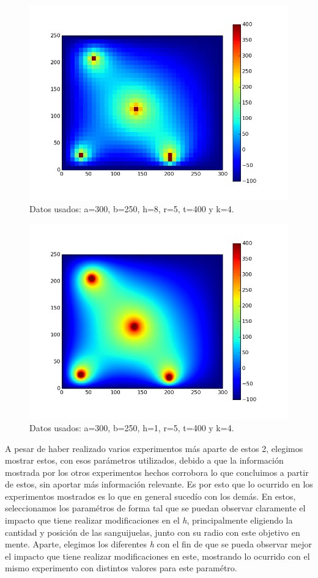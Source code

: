 \documentclass[10pt, a4paper]{article}
\begin{document}
\begin{figure}[H]
\centering
\includegraphics[scale=0.4]{E2ConH8.png}
\caption{Datos usados: a=300, b=250, h=8, r=5, t=400 y k=4.}
\end{figure}

\begin{figure}[H]
\centering
\includegraphics[scale=0.4]{E2ConH1.png}
\caption{Datos usados: a=300, b=250, h=1, r=5, t=400 y k=4.}
\end{figure}

A pesar de haber realizado varios experimentos m\'as aparte de estos 2, elegimos mostrar estos, con esos par\'ametros utilizados, debido a que la informaci\'on mostrada por los otros experimentos hechos corrobora lo que concluimos a partir de estos, sin aportar m\'as informaci\'on relevante. Es por esto que lo ocurrido en los experimentos mostrados es lo que en general suced\'io con los dem\'as. En estos, seleccionamos los param\'etros de forma tal que se puedan observar claramente el impacto que tiene realizar modificaciones en el \textit{h}, principalmente eligiendo la cantidad y posici\'on de las sanguijuelas, junto con su radio con este objetivo en mente. Aparte, elegimos los diferentes \textit{h} con el fin de que se pueda observar mejor el impacto que tiene realizar modificaciones en este, mostrando lo ocurrido con el mismo experimento con distintos valores para este param\'etro.
\end{document}
